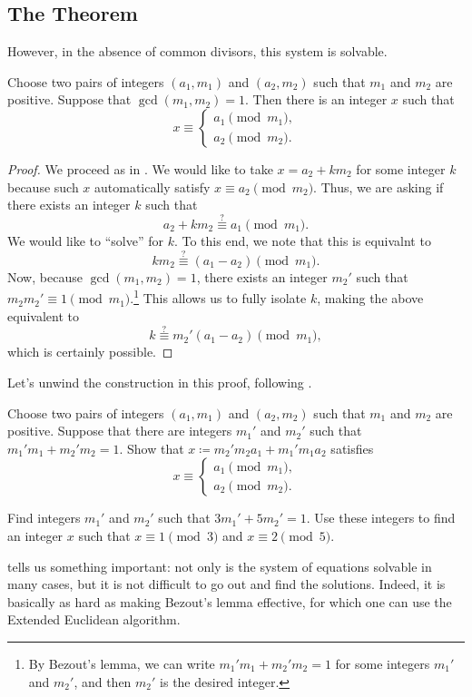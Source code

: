 \documentclass{article}
\begin{document}
\subsection{The Theorem}
However, in the absence of common divisors, this system is solvable.
\begin{theorem} \label{thm:crt-exist}
	Choose two pairs of integers $(a_1,m_1)$ and $(a_2,m_2)$ such that $m_1$ and $m_2$ are positive. Suppose that $\gcd(m_1,m_2)=1$. Then there is an integer $x$ such that
	\[x\equiv\begin{cases}
		a_1 \pmod{m_1}, \\
		a_2 \pmod{m_2}.
	\end{cases}\]
\end{theorem}
\begin{proof}
	We proceed as in . We would like to take $x=a_2+km_2$ for some integer $k$ because such $x$ automatically satisfy $x\equiv a_2\pmod{m_2}$. Thus, we are asking if there exists an integer $k$ such that
	\[a_2+km_2\stackrel?\equiv a_1\pmod{m_1}.\]
	We would like to ``solve'' for $k$. To this end, we note that this is equivalnt to
	\[km_2\stackrel?\equiv(a_1-a_2)\pmod{m_1}.\]
	Now, because $\gcd(m_1,m_2)=1$, there exists an integer $m_2'$ such that $m_2m_2'\equiv1\pmod{m_1}$.\footnote{\label{footnote:mod-inv} By Bezout's lemma, we can write $m_1'm_1+m_2'm_2=1$ for some integers $m_1'$ and $m_2'$, and then $m_2'$ is the desired integer.} This allows us to fully isolate $k$, making the above equivalent to
	\[k\stackrel?\equiv m_2'(a_1-a_2)\pmod{m_1},\]
	which is certainly possible.
\end{proof}
Let's unwind the construction in this proof, following .
\begin{exe} \label{exe:solve-crt}
	Choose two pairs of integers $(a_1,m_1)$ and $(a_2,m_2)$ such that $m_1$ and $m_2$ are positive. Suppose that there are integers $m_1'$ and $m_2'$ such that $m_1'm_1+m_2'm_2=1$. Show that $x\coloneqq m_2'm_2a_1+m_1'm_1a_2$ satisfies
	\[x\equiv\begin{cases}
		a_1\pmod{m_1}, \\
		a_2\pmod{m_2}.
	\end{cases}\]
\end{exe}
\begin{exe}
	Find integers $m_1'$ and $m_2'$ such that $3m_1'+5m_2'=1$. Use these integers to find an integer $x$ such that $x\equiv1\pmod3$ and $x\equiv2\pmod5$.	
\end{exe}
\begin{remark}
	 tells us something important: not only is the system of equations solvable in many cases, but it is not difficult to go out and find the solutions. Indeed, it is basically as hard as making Bezout's lemma effective, for which one can use the Extended Euclidean algorithm.
\end{remark}
\end{document}
